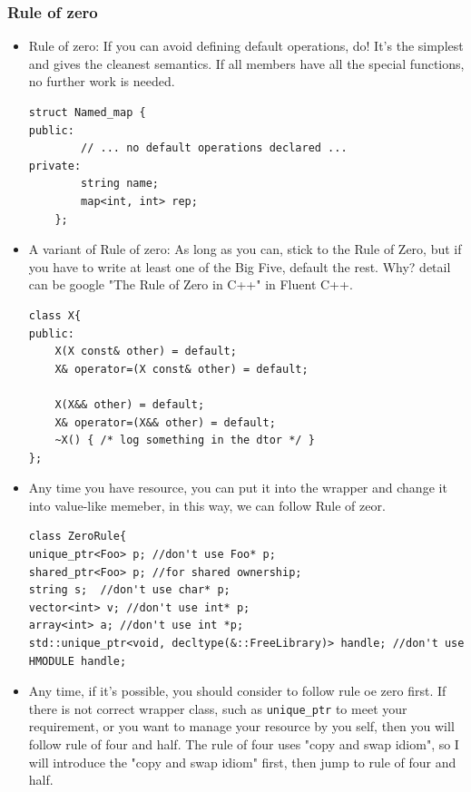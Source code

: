 \documentclass[a4paper,11pt,twoside]{book}
\begin{document}
\subsubsection{Rule of zero}
\begin{itemize}
    \item Rule of zero: If you can avoid defining default operations, do! It’s the simplest and gives the cleanest semantics. If all members have all the special functions, no further work is needed.
	
\begin{lstlisting}
struct Named_map {
public:
		// ... no default operations declared ...
private:
		string name;
		map<int, int> rep;
	};
\end{lstlisting}

	\item A variant of Rule of zero: As long as you can, stick to the Rule of Zero, but if you have to write at least one of the Big Five, default the rest. Why? detail can be google "The Rule of Zero in C++" in Fluent C++.
	 
\begin{lstlisting}
class X{
public:
	X(X const& other) = default;
	X& operator=(X const& other) = default;
	
	X(X&& other) = default;
	X& operator=(X&& other) = default;
	~X() { /* log something in the dtor */ }
};
\end{lstlisting}

    \item Any time you have resource, you can put it into the wrapper and change it into value-like memeber, in this way, we can follow Rule of zeor.

\begin{lstlisting}
class ZeroRule{
unique_ptr<Foo> p; //don't use Foo* p;
shared_ptr<Foo> p; //for shared ownership;
string s;  //don't use char* p;
vector<int> v; //don't use int* p;
array<int> a; //don't use int *p;
std::unique_ptr<void, decltype(&::FreeLibrary)> handle; //don't use HMODULE handle;
\end{lstlisting}

    \item Any time, if it's possible, you should consider to follow rule oe zero first. If there is not correct wrapper class, such as \texttt{unique\_ptr} to meet your requirement, or you want to manage your resource by you self, then you will follow rule of four and half. The rule of four uses "copy and swap idiom", so I will introduce the "copy and swap idiom" first, then jump to rule of four and half.

\end{itemize}
\end{document}
